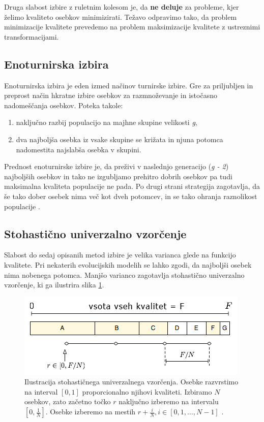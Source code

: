 \documentclass[a4paper, 12pt]{book}
\begin{document}
Druga slabost izbire z ruletnim kolesom je, da \textbf{ne deluje} za probleme, kjer \v zelimo kvaliteto osebkov minimizirati. Te\v zavo odpravimo tako, da problem minimizacije kvalitete prevedemo na problem maksimizacije kvalitete z ustreznimi transformacijami.

\subsection{Enoturnirska izbira}
Enoturnirska izbira je eden izmed na\v cinov turnirske izbire. Gre za priljubljen in preprost na\v cin hkratne izbire osebkov za razmno\v zevanje in isto\v casno nadome\v s\v canja osebkov. Poteka takole:
\begin{enumerate}
\item naklju\v cno razbij populacijo na majhne skupine velikosti \textit{g},
\item dva najbolj\v sa osebka iz vsake skupine se kri\v zata in njuna potomca nadomestita najslab\v sa osebka v skupini.
\end{enumerate}

Prednost enoturnirske izbire je, da pre\v zivi v naslednjo generacijo (\textit{g - 2}) najbolj\v sih osebkov in tako ne izgubljamo prehitro dobrih osebkov pa tudi maksimalna kvaliteta populacije ne pada. Po drugi strani strategija zagotavlja, da \v se tako dober osebek nima ve\v c kot dveh potomcev, in se tako ohranja raznolikost populacije
\cite{inteligentni sistemi}.

\subsection{Stohasti\v cno univerzalno vzor\v cenje}
Slabost do sedaj opisanih metod izbire je velika varianca glede na funkcijo kvalitete. Pri nekaterih evolucijskih modelih se lahko zgodi, da najbolj\v si osebek nima nobenega potomca. Manj\v so varianco zagotavlja stohasti\v cno univerzalno vzor\v cenje, ki ga ilustrira slika \ref{fig:stohasticno univerzalno vzorcenje}.

\begin{figure}
\begin{center}
\includegraphics[scale=0.75]{stohasticno_univerzalno_vzorcenje.png}
\end{center}
\caption{Ilustracija stohasti\v cnega univerzalnega vzor\v cenja. Osebke razvrstimo na interval $[0, 1]$ proporcionalno njihovi kvaliteti. Izbiramo $N$ osebkov, zato za\v cetno to\v cko $r$ naklju\v cno izberemo na intervalu $[0, \frac{1}{N}]$. Osebke izberemo na mestih $r + \frac{i}{N}, i \in [0, 1, \dots, N-1]$ \cite{inteligentni sistemi}.}
\label{fig:stohasticno univerzalno vzorcenje}
\end{figure}
\end{document}
